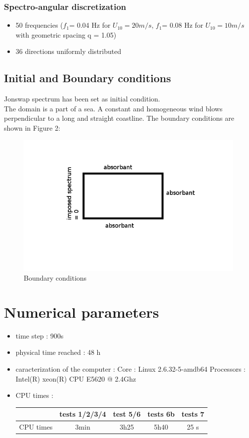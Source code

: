 \documentclass[10pt]{article}
\begin{document}
\subsubsection{Spectro-angular discretization}
\begin{itemize}
\item 50 frequencies ($f_1 $= 0.04 Hz for $U_{10} = 20m/s$, $f_1 $= 0.08 Hz for $U_{10} = 10m/s$ with geometric spacing q = 1.05)
\item 36 directions uniformly distributed
\end{itemize}

\subsection{Initial and Boundary conditions}
Jonswap spectrum has been set as initial condition.\\
The domain is a part of a sea. A constant and homogeneous wind blows perpendicular to a long and straight coastline. The boundary conditions are shown in Figure 2:
\begin{figure}
\centering
\includegraphics[scale=0.5]{boundarycond.jpg}
\caption{Boundary conditions}
\end{figure}
\section{Numerical parameters}
\begin{itemize}
\item time step : 900s
\item physical time reached : 48 h
\item caracterization of the computer : \subitem Core : Linux 2.6.32-5-amdb64 \subitem Processors : Intel(R) 
xeon(R) CPU E5620 @ 2.4Ghz
\item CPU times : \\
\begin{tabular}{c|c|c|c|c}
 & tests 1/2/3/4 & test 5/6 &tests 6b & tests 7\\
 \hline
CPU times & 3min & 3h25 & 5h40 & 25 s \\
\end{tabular}
\end{itemize}
\end{document}

